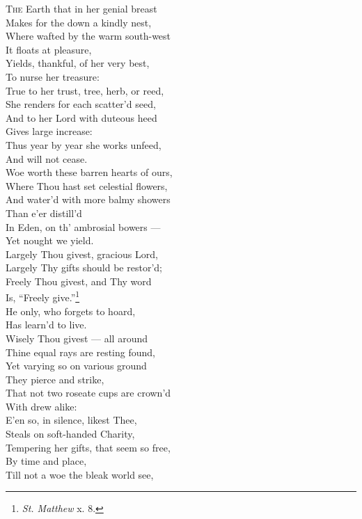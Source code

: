\textsc{The} Earth that in her genial breast \\
 Makes for the down a kindly nest, \\
 Where wafted by the warm south-west \\
 It floats at pleasure, \\
 Yields, thankful, of her very best, \\
 To nurse her treasure: \\
  True to her trust, tree, herb, or reed, \\
 She renders for each scatter’d seed, \\
 And to her Lord with duteous heed \\
 Gives large increase: \\
 Thus year by year she works unfeed, \\
 And will not cease. \\
  Woe worth these barren hearts of ours, \\
 Where Thou hast set celestial flowers, \\
 And water’d with more balmy showers \\
 Than e’er distill’d \\
 In Eden, on th’ ambrosial bowers — \\
 Yet nought we yield. \\
  Largely Thou givest, gracious Lord, \\
 Largely Thy gifts should be restor’d; \\
 Freely Thou givest, and Thy word \\
 Is, “Freely give.”\footnote{\emph{St. Matthew} x. 8.} \\
 He only, who forgets to hoard, \\
 Has learn’d to live. \\
  Wisely Thou givest — all around \\
 Thine equal rays are resting found, \\
 Yet varying so on various ground \\
 They pierce and strike, \\
 That not two roseate cups are crown’d \\
 With drew alike: \\
  E’en so, in silence, likest Thee, \\
 Steals on soft-handed Charity, \\
 Tempering her gifts, that seem so free, \\
 By time and place, \\
 Till not a woe the bleak world see, \\
